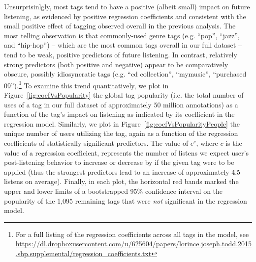 Unsurprisinlgly, most tags tend to have a positive (albeit small) impact on future listening, as evidenced by positive regression coefficients and consistent with the small positive effect of tagging observed overall in the previous analysis. The most telling observation is that commonly-used genre tags (e.g. ``pop'', ``jazz'', and ``hip-hop'') -- which are the most common tags overall in our full dataset -- tend to be weak, positive predictors of future listening. In contrast, relatively strong predictors (both positive and negative) appear to be comparatively obscure, possibly idiosyncratic tags (e.g. ``cd collection'', ``mymusic'', ``purchased 09'').\footnote{For a full listing of the regression coefficients across all tags in the model, see \url{https://dl.dropboxusercontent.com/u/625604/papers/lorince.joseph.todd.2015.sbp.supplemental/regression_coefficients.txt}} To examine this trend quantitatively, we plot in Figure~\ref{fig:coefVsPopularity} the global tag popularity (i.e. the total number of uses of a tag in our full dataset of approximately 50 million annotations) as a function of the tag's impact on listening as indicated by its coefficient in the regression model. Similarly, we plot in Figure~\ref{fig:coefVsPopularityPeople} the unique number of users utilizing the tag, again as a function of the regression coefficients of statistically significant predictors. The value of $e^c$, where $c$ is the value of a regression coefficient, represents the number of listens we expect user's post-listening behavior to increase or decrease by if the given tag were to be applied (thus the strongest predictors lead to an increase of approximately 4.5 listens on average). Finally, in each plot, the horizontal red bands marked the upper and lower limits of a bootstrapped 95\% confidence interval on the popularity of the 1,095 remaining tags that were \emph{not} significant in the regression model. 
